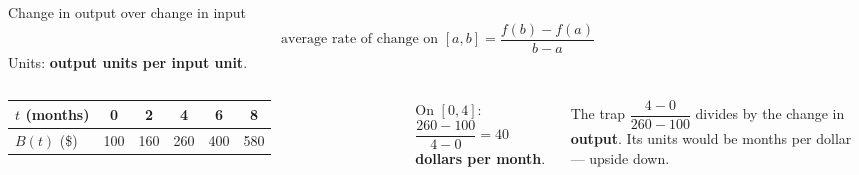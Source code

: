 \documentclass[aspectratio=169, 11pt]{beamer}
\begin{document}
\begin{frame}[t, plain]

  \begin{block}{Change in output over change in input}
    \[ \text{average rate of change on } [a, b] = \frac{f(b) - f(a)}{b - a} \]
    Units: \textbf{output units per input unit}.
  \end{block}

  \begin{columns}[T]
      \begin{tabular}{|l|c|c|c|c|c|}
      \hline
      \(t\) (months) & 0 & 2 & 4 & 6 & 8 \\ \hline
      \(B(t)\) (\$)  & 100 & 160 & 260 & 400 & 580 \\ \hline
      \end{tabular}

      \medskip
      On \([0, 4]\): \(\dfrac{260 - 100}{4 - 0} = 40\) \textbf{dollars per month}.

      \begin{block}{The trap}
        \(\dfrac{4 - 0}{260 - 100}\) divides by the change in \textbf{output}. Its units
        would be months per dollar --- upside down.
      \end{block}
  \end{columns}
\end{frame}
\end{document}
